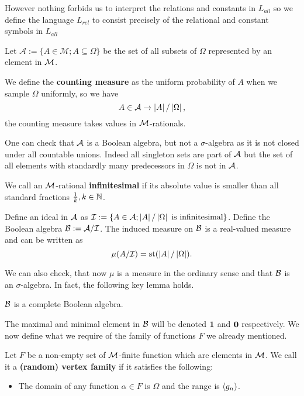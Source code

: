 However nothing forbids us to interpret the relations and constants in $L_{all}$ so we define the language $L_{rel}$ to consist precisely of the relational and constant symbols in $L_{all}$

\begin{defi}
Let $\mathcal{A}:=\{A\in\mathcal{M};A\subseteq \Omega\}$ be the set of all subsets of $\Omega$ represented by an element in $\mathcal{M}$.

We define the \textbf{counting measure} as the uniform probability of $A$ when we sample $\Omega$ uniformly, so we have
\[A\in\mathcal{A} \to \left|{A}\right|/\left|{\Omega}\right|,\]
the counting measure takes values in $\mathcal{M}$-rationals.
\end{defi}

One can check that $\mathcal{A}$ is a Boolean algebra, but not a $\sigma$-algebra as it is not closed under all countable unions. Indeed all singleton sets are part of $\mathcal{A}$ but the set of all elements with standardly many predecessors in $\Omega$ is not in $\mathcal{A}$.

\begin{defi}\label{defiinfinitesimal}
We call an $\mathcal{M}$-rational \textbf{infinitesimal} if its absolute value is smaller than all standard fractions $\frac{1}{k},k\in\mathbb{N}$.

Define an ideal in $\mathcal{A}$ as $\mathcal{I}:=\{A\in\mathcal{A};\left|{A}\right|/\left|{\Omega}\right|\text{ is infinitesimal}\}$. Define the Boolean algebra $\mathcal{B}:=\mathcal{A}/\mathcal{I}$. The induced measure on $\mathcal{B}$ is a real-valued measure and can be written as \[\mu(A/\mathcal{I})=\text{st}(\left|{A}\right|/\left|{\Omega}\right|).\]
\end{defi}

We can also check, that now $\mu$ is a measure in the ordinary sense and that $\mathcal{B}$ is an $\sigma$-algebra. In fact, the following key lemma holds.

\begin{lemm}
$\mathcal{B}$ is a complete Boolean algebra.
\end{lemm}

The maximal and minimal element in $\mathcal{B}$ will be denoted $\textbf{1}$ and $\textbf{0}$ respectively. We now define what we require of the family of functions $F$ we already mentioned.

\begin{defi}
Let $F$ be a non-empty set of $\mathcal{M}$-finite function which are elements in $\mathcal{M}$. We call it a \textbf{(random) vertex family} if it satisfies the following:
\begin{itemize}
\item The domain of any function $\alpha\in F$ is $\Omega$ and the range is $\langle g_n)$.
\end{itemize}
\end{defi}

